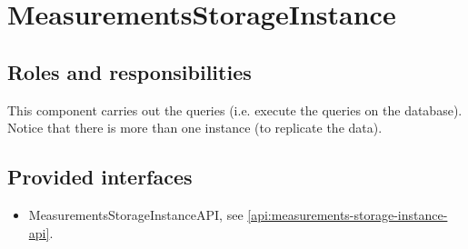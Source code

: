 \section{MeasurementsStorageInstance}
\label{element:measurements-storage-instance}

\subsection{Roles and responsibilities}

\npar This component carries out the queries (i.e. execute the queries on the
database). Notice that there is more than one instance (to replicate the data).

\subsection{Provided interfaces}

\begin{itemize}
  \item MeasurementsStorageInstanceAPI, see
  \ref{api:measurements-storage-instance-api}.
\end{itemize}